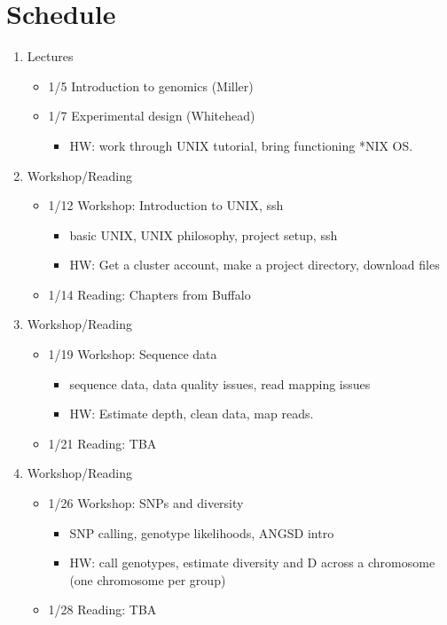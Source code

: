 \documentclass[]{article}
\begin{document}
\section*{Schedule}
\begin{enumerate}

\item Lectures
\begin{itemize}
\item 1/5 Introduction to genomics (Miller)
\item 1/7 Experimental design (Whitehead)
	\begin{itemize}
	\item HW: work through UNIX tutorial, bring functioning *NIX OS.
	\end{itemize}
\end{itemize}

\item Workshop/Reading
\begin{itemize}
	\item 1/12 Workshop: Introduction to UNIX, ssh
	\begin{itemize}
		\item basic UNIX, UNIX philosophy, project setup, ssh
		\item HW: Get a cluster account, make a project directory, download files
	\end{itemize}
	\item 1/14 Reading: Chapters from Buffalo
\end{itemize}

\item Workshop/Reading
	\begin{itemize}
	\item 1/19 Workshop: Sequence data
		\begin{itemize}
		\item sequence data, data quality issues, read mapping issues
		\item HW: Estimate depth, clean data, map reads.
		\end{itemize}
	\item 1/21 Reading: TBA
\end{itemize}

\item Workshop/Reading
	\begin{itemize}
	\item 1/26 Workshop: SNPs and diversity
		\begin{itemize}
		\item SNP calling, genotype likelihoods, ANGSD intro
		\item HW: call genotypes, estimate diversity and D across a chromosome (one chromosome per group)
		\end{itemize}
	\item 1/28 Reading: TBA
\end{itemize}


\end{enumerate}
\end{document}
